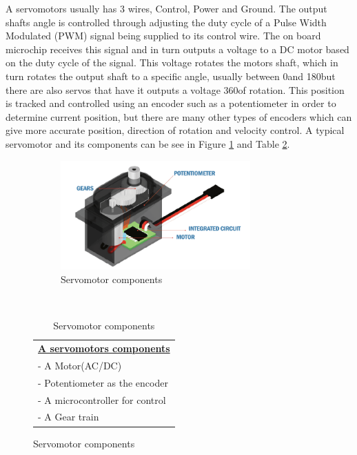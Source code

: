 \vspace{-8mm}
A servomotors usually has 3 wires, Control, Power and Ground. The output shafts angle is controlled through adjusting the duty cycle of a Pulse Width Modulated (PWM) signal being supplied to its control wire. The on board microchip receives this signal and in turn outputs a voltage to a DC motor based on the duty cycle of the signal. This voltage rotates the motors shaft, which in turn rotates the output shaft to a specific angle, usually  between 0\degree and 180\degree but there are also servos that have it outputs a voltage 360\degree  of rotation. This position is tracked and controlled using an encoder such as a potentiometer in order to determine current position, but there are many other types of encoders which can give more accurate position, direction of rotation and velocity control. A typical servomotor and its components can be see in Figure \ref{fig:servoexplode} and Table \ref{tab:servomotorcomponents}. 
\vspace{-3mm}
\begin{figure}[H]
  \begin{minipage}[b]{0.48\textwidth}
    \begin{figure}[H]
        \centering
        \includegraphics[width=0.8\textwidth]{Servoexploded.png}
        \caption{Servomotor components\cite{servoexplode}}
        \label{fig:servoexplode}
    \end{figure} 
\end{minipage}
\hfill
\begin{minipage}[b]{0.48\textwidth}
  \
    \begin{table}[H]
        \centering
        \begin{tabular}{|l|}
        \hline
        \textbf{\underline{A servomotors components}}\\
             - A Motor(AC/DC) \\
             - Potentiometer as the encoder \\
             - A microcontroller for control \\
             - A Gear train \\
         \hline
        \end{tabular}
    \caption{Servomotor components }
    \label{tab:servomotorcomponents}
    \end{table}
  \end{minipage}
\end{figure}
\vspace{-10mm}

